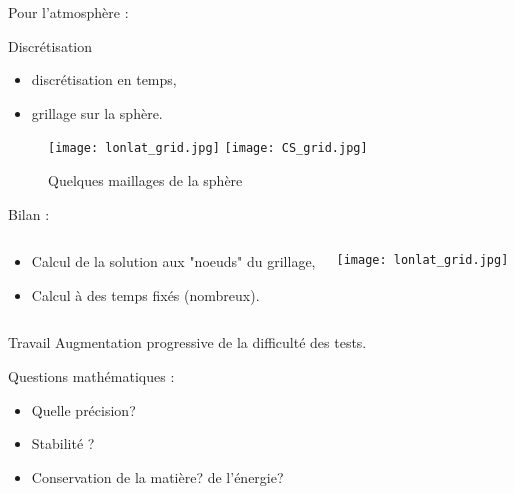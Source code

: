 \documentclass[11pt]{beamer}
\begin{document}
\begin{frame}{Pour l'atmosphère :}

\begin{block}{Discrétisation}
\begin{itemize}
\item discrétisation en temps,
\item grillage sur la sphère.
\end{itemize}
\end{block}

\begin{figure}
\texttt{[image: lonlat\_grid.jpg]} \hspace{1cm}
\texttt{[image: CS\_grid.jpg]}
\caption{Quelques maillages de la sphère}
\end{figure}

\end{frame}

\begin{frame}{Bilan :}
\begin{columns}
\begin{block}{}
\begin{itemize}
\item Calcul de la solution aux "noeuds" du grillage,
\item Calcul à des temps fixés (nombreux).
\end{itemize}
\end{block}

\begin{center}
\texttt{[image: lonlat\_grid.jpg]} 
\end{center}
\end{columns}
\end{frame}

\begin{frame}

\begin{block}{Travail}
Augmentation progressive de la difficulté des tests.
\end{block}

\pause

\begin{block}{Questions mathématiques :}
\begin{itemize}
\item Quelle précision?
\item Stabilité ?
\item Conservation de la matière? de l'énergie?
\end{itemize}
\end{block}

\begin{center}
\end{center}

\end{frame}
\end{document}
